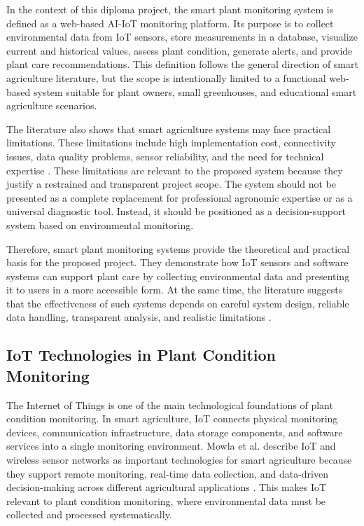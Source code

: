 In the context of this diploma project, the smart plant monitoring system is defined as a web-based AI-IoT monitoring platform. Its purpose is to collect environmental data from IoT sensors, store measurements in a database, visualize current and historical values, assess plant condition, generate alerts, and provide plant care recommendations. This definition follows the general direction of smart agriculture literature, but the scope is intentionally limited to a functional web-based system suitable for plant owners, small greenhouses, and educational smart agriculture scenarios.

The literature also shows that smart agriculture systems may face practical limitations. These limitations include high implementation cost, connectivity issues, data quality problems, sensor reliability, and the need for technical expertise \cite{miller2025iot,nawaz2025iot}. These limitations are relevant to the proposed system because they justify a restrained and transparent project scope. The system should not be presented as a complete replacement for professional agronomic expertise or as a universal diagnostic tool. Instead, it should be positioned as a decision-support system based on environmental monitoring.

Therefore, smart plant monitoring systems provide the theoretical and practical basis for the proposed project. They demonstrate how IoT sensors and software systems can support plant care by collecting environmental data and presenting it to users in a more accessible form. At the same time, the literature suggests that the effectiveness of such systems depends on careful system design, reliable data handling, transparent analysis, and realistic limitations \cite{mowla2023iot,miller2025iot,nawaz2025iot}.
\subsection{IoT Technologies in Plant Condition Monitoring}

The Internet of Things is one of the main technological foundations of plant condition monitoring. In smart agriculture, IoT connects physical monitoring devices, communication infrastructure, data storage components, and software services into a single monitoring environment. Mowla et al. describe IoT and wireless sensor networks as important technologies for smart agriculture because they support remote monitoring, real-time data collection, and data-driven decision-making across different agricultural applications \cite{mowla2023iot,ayaz2019iot}. This makes IoT relevant to plant condition monitoring, where environmental data must be collected and processed systematically.

